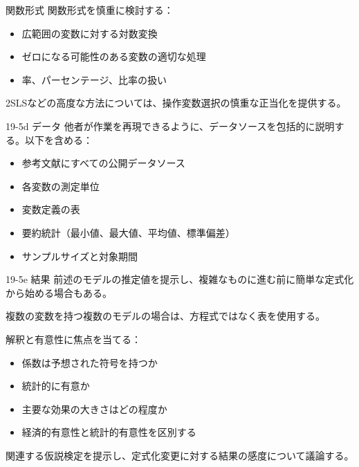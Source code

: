 \documentclass[
  ignorenonframetext,
]{beamer}
\providecommand{\tightlist}{%
  \setlength{\itemsep}{0pt}\setlength{\parskip}{0pt}}
\begin{document}
\begin{frame}{関数形式}
\label{ux95a2ux6570ux5f62ux5f0f}
関数形式を慎重に検討する：

\begin{itemize}
\tightlist
\item
  広範囲の変数に対する対数変換
\item
  ゼロになる可能性のある変数の適切な処理
\item
  率、パーセンテージ、比率の扱い
\end{itemize}

2SLSなどの高度な方法については、操作変数選択の慎重な正当化を提供する。
\end{frame}

\begin{frame}{19-5d データ}
\label{d-ux30c7ux30fcux30bf}
他者が作業を再現できるように、データソースを包括的に説明する。以下を含める：

\begin{itemize}
\tightlist
\item
  参考文献にすべての公開データソース
\item
  各変数の測定単位
\item
  変数定義の表
\item
  要約統計（最小値、最大値、平均値、標準偏差）
\item
  サンプルサイズと対象期間
\end{itemize}
\end{frame}

\begin{frame}{19-5e 結果}
\label{e-ux7d50ux679c}
前述のモデルの推定値を提示し、複雑なものに進む前に簡単な定式化から始める場合もある。

複数の変数を持つ複数のモデルの場合は、方程式ではなく表を使用する。

解釈と有意性に焦点を当てる：

\begin{itemize}
\tightlist
\item
  係数は予想された符号を持つか
\item
  統計的に有意か
\item
  主要な効果の大きさはどの程度か
\item
  経済的有意性と統計的有意性を区別する
\end{itemize}

関連する仮説検定を提示し、定式化変更に対する結果の感度について議論する。
\end{frame}
\end{document}
